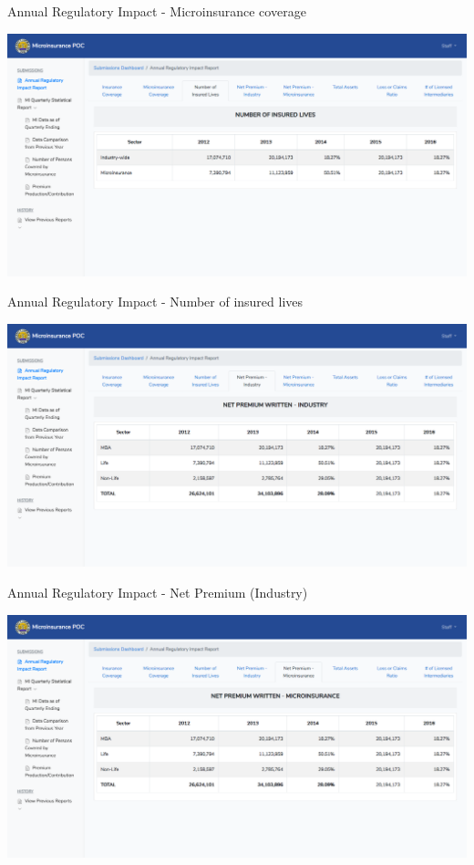 \documentclass{article}
\begin{document}
Annual Regulatory Impact - Microinsurance
coverage%

\includegraphics[keepaspectratio=true]{up-ic-screens/image162}{}%

Annual Regulatory Impact - Number of insured
lives%

\includegraphics[keepaspectratio=true]{up-ic-screens/image117}{}%

Annual Regulatory Impact - Net Premium
(Industry)%

\includegraphics[keepaspectratio=true]{up-ic-screens/image71}{}%
\end{document}

